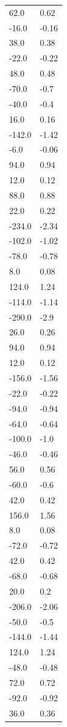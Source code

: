 \begin{longtable}{ll}
62.0 & 0.62 \\
-16.0 & -0.16 \\
38.0 & 0.38 \\
-22.0 & -0.22 \\
48.0 & 0.48 \\
-70.0 & -0.7 \\
-40.0 & -0.4 \\
16.0 & 0.16 \\
-142.0 & -1.42 \\
-6.0 & -0.06 \\
94.0 & 0.94 \\
12.0 & 0.12 \\
88.0 & 0.88 \\
22.0 & 0.22 \\
-234.0 & -2.34 \\
-102.0 & -1.02 \\
-78.0 & -0.78 \\
8.0 & 0.08 \\
124.0 & 1.24 \\
-114.0 & -1.14 \\
-290.0 & -2.9 \\
26.0 & 0.26 \\
94.0 & 0.94 \\
12.0 & 0.12 \\
-156.0 & -1.56 \\
-22.0 & -0.22 \\
-94.0 & -0.94 \\
-64.0 & -0.64 \\
-100.0 & -1.0 \\
-46.0 & -0.46 \\
56.0 & 0.56 \\
-60.0 & -0.6 \\
42.0 & 0.42 \\
156.0 & 1.56 \\
8.0 & 0.08 \\
-72.0 & -0.72 \\
42.0 & 0.42 \\
-68.0 & -0.68 \\
20.0 & 0.2 \\
-206.0 & -2.06 \\
-50.0 & -0.5 \\
-144.0 & -1.44 \\
124.0 & 1.24 \\
-48.0 & -0.48 \\
72.0 & 0.72 \\
-92.0 & -0.92 \\
36.0 & 0.36 \\

\end{longtable}
